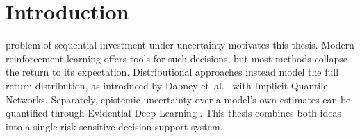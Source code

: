 \chapter*{Introduction}

 problem of sequential investment under uncertainty motivates this thesis. Modern reinforcement learning offers tools for such decisions, but most methods collapse the return to its expectation. Distributional approaches instead model the full return distribution, as introduced by Dabney et~al.~\cite{dabney2018implicit} with Implicit Quantile Networks. Separately, epistemic uncertainty over a model's own estimates can be quantified through Evidential Deep Learning \cite{sensoy2018evidential}. This thesis combines both ideas \cite{dabney2018implicit, sensoy2018evidential} into a single risk-sensitive decision support system.
